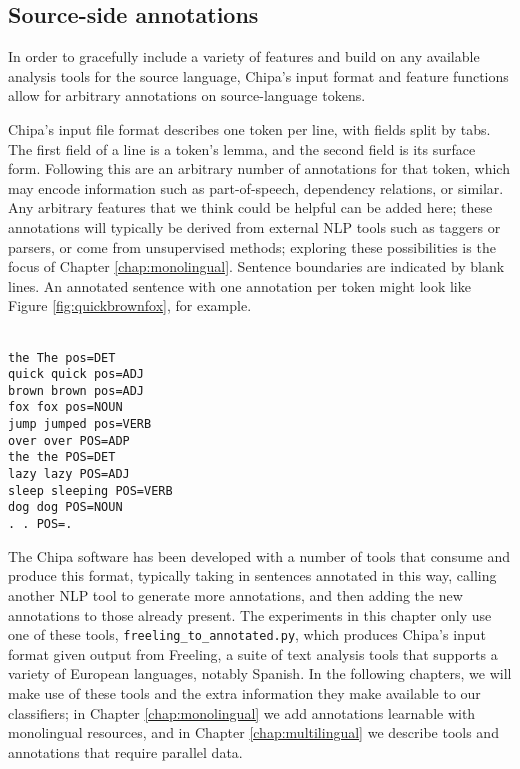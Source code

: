 \subsection{Source-side annotations}
\label{sec:annotations}
In order to gracefully include a variety of features and build on
any available analysis tools for the source language, Chipa's input format and
feature functions allow for arbitrary annotations on source-language tokens.

Chipa's input file format describes one token per line, with fields split by
tabs.  The first field of a line is a token's lemma, and the second field is
its surface form. Following this are an arbitrary number of annotations for
that token, which may encode information such as part-of-speech, dependency
relations, or similar. Any arbitrary features that we think could be helpful
can be added here; these annotations will typically be derived from external
NLP tools such as taggers or parsers, or come from unsupervised methods;
exploring these possibilities is the focus of Chapter \ref{chap:monolingual}.
Sentence boundaries are indicated by blank lines. An
annotated sentence with one annotation per token might look like Figure
\ref{fig:quickbrownfox}, for example.

\begin{figure*}
\raggedright \texttt{\\
the	The	pos=DET \\
quick	quick	pos=ADJ \\
brown	brown	pos=ADJ \\
fox	fox	pos=NOUN \\
jump	jumped	pos=VERB \\
over	over	POS=ADP \\
the	the	POS=DET \\
lazy	lazy	POS=ADJ \\
sleep sleeping	POS=VERB \\
dog	dog	POS=NOUN \\
.	.	POS=. \\
  }
  \caption{Example annotated sentence.}
  \label{fig:quickbrownfox}
\end{figure*}

The Chipa software has been developed with a number of tools that consume and
produce this format, typically taking in sentences annotated in this way,
calling another NLP tool to generate more annotations, and then adding the new
annotations to those already present. The experiments in this chapter only use
one of these tools, \texttt{freeling\_to\_annotated.py}, which produces Chipa's
input format given output from Freeling\cite{padro12}, a suite of text analysis
tools that supports a variety of European languages, notably Spanish.
In the following chapters, we will make use of these tools and the extra
information they make available to our classifiers; in Chapter
\ref{chap:monolingual} we add annotations learnable with monolingual resources,
and in Chapter \ref{chap:multilingual} we describe tools and annotations that
require parallel data.

